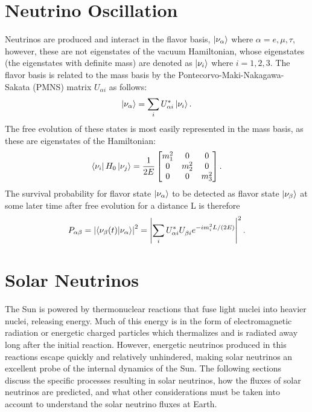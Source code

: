 \section{Neutrino Oscillation}
\label{ch:theory}

Neutrinos are produced and interact in the flavor basis, $\ket{\nu_{\alpha}}$ where $\alpha = {e,\mu,\tau}$, however, these are not eigenstates of the vacuum Hamiltonian, whose eigenstates (the eigenstates with definite mass) are denoted as $\ket{\nu_i}$ where $i = {1,2,3}$. 
The flavor basis is related to the mass basis by the Pontecorvo-Maki-Nakagawa-Sakata (PMNS) matrix $U_{\alpha i}$ as follows:
\begin{equation}
\ket{\nu_{\alpha}} = \sum_i U^*_{\alpha i} \ket{\nu_i}.
\end{equation}
The free evolution of these states is most easily represented in the mass basis, as these are eigenstates of the Hamiltonian:
\begin{equation}
\bra{\nu_i}H_{0}\ket{\nu_j} = \frac{1}{2E}\begin{bmatrix}
m_1^2 & 0 & 0 \\
0 & m_2^2 & 0 \\
0 & 0 & m_3^2
\end{bmatrix}.
\end{equation}
The survival probability for flavor state $\ket{\nu_\alpha}$ to be detected as flavor state $\ket{\nu_\beta}$ at some later time after free evolution for a distance L is therefore
\begin{equation}
P_{\alpha\beta} = \left|\braket{\nu_\beta(t)}{\nu_\alpha}\right|^2 = \left|\sum_i U^*_{\alpha i} U^{}_{\beta i} e^{- i m_i^2 L/(2E)} \right|^2.
\end{equation}

\section{Solar Neutrinos}

The Sun is powered by thermonuclear reactions that fuse light nuclei into heavier nuclei, releasing energy.
Much of this energy is in the form of electromagnetic radiation or energetic charged particles which thermalizes and is radiated away long after the initial reaction.
However, energetic neutrinos produced in this reactions escape quickly and relatively unhindered, making solar neutrinos an excellent probe of the internal dynamics of the Sun.
The following sections discuss the specific processes resulting in solar neutrinos, how the fluxes of solar neutrinos are predicted, and what other considerations must be taken into account to understand the solar neutrino fluxes at Earth.

